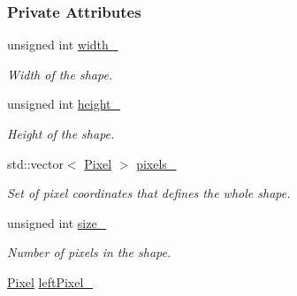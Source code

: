 \subsubsection*{Private Attributes}
\begin{CompactItemize}
\item 
\hypertarget{class_shape_863661d529942b525830d2208259583b}{
unsigned int \hyperlink{class_shape_863661d529942b525830d2208259583b}{width\_\-}}
\label{class_shape_863661d529942b525830d2208259583b}

\begin{CompactList}\small\item\em Width of the shape. \item\end{CompactList}\item 
\hypertarget{class_shape_76354eeb3b4c5c6c9125f4195c3c274c}{
unsigned int \hyperlink{class_shape_76354eeb3b4c5c6c9125f4195c3c274c}{height\_\-}}
\label{class_shape_76354eeb3b4c5c6c9125f4195c3c274c}

\begin{CompactList}\small\item\em Height of the shape. \item\end{CompactList}\item 
\hypertarget{class_shape_286ebb0c6010efe288d5e79192e309dc}{
std::vector$<$ \hyperlink{_pixel_8hpp_535e59456e3e633842529cfa8ea103c4}{Pixel} $>$ \hyperlink{class_shape_286ebb0c6010efe288d5e79192e309dc}{pixels\_\-}}
\label{class_shape_286ebb0c6010efe288d5e79192e309dc}

\begin{CompactList}\small\item\em Set of pixel coordinates that defines the whole shape. \item\end{CompactList}\item 
\hypertarget{class_shape_adec7080fb17de89d2f6c9d53d4b0283}{
unsigned int \hyperlink{class_shape_adec7080fb17de89d2f6c9d53d4b0283}{size\_\-}}
\label{class_shape_adec7080fb17de89d2f6c9d53d4b0283}

\begin{CompactList}\small\item\em Number of pixels in the shape. \item\end{CompactList}\item 
\hypertarget{class_shape_812cd080959b320038aae54729831ce4}{
\hyperlink{_pixel_8hpp_535e59456e3e633842529cfa8ea103c4}{Pixel} \hyperlink{class_shape_812cd080959b320038aae54729831ce4}{leftPixel\_\-}}
\label{class_shape_812cd080959b320038aae54729831ce4}


\end{CompactItemize}
